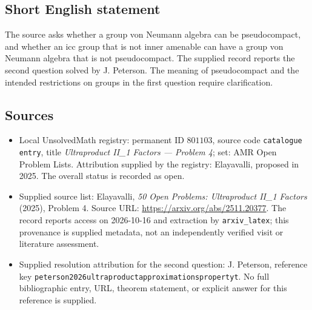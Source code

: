 \documentclass[11pt]{article}
\begin{document}
\subsection{Short English statement}
The source asks whether a group von Neumann algebra can be pseudocompact, and whether an icc group that is not inner amenable can have a group von Neumann algebra that is not pseudocompact. The supplied record reports the second question solved by J. Peterson. The meaning of pseudocompact and the intended restrictions on groups in the first question require clarification.
\subsection{Sources}
\begin{itemize}
\item Local UnsolvedMath registry: permanent ID \(801103\), source code \texttt{catalogue entry}, title \emph{Ultraproduct II\_1 Factors --- Problem 4}; set: AMR Open Problem Lists. Attribution supplied by the registry: Elayavalli, proposed in 2025. The overall status is recorded as open.
\item Supplied source list: Elayavalli, \emph{50 Open Problems: Ultraproduct II\_1 Factors} (2025), Problem 4. Source URL: \url{https://arxiv.org/abs/2511.20377}. The record reports access on 2026-10-16 and extraction by \texttt{arxiv\_latex}; this provenance is supplied metadata, not an independently verified visit or literature assessment.
\item Supplied resolution attribution for the second question: J. Peterson, reference key \texttt{peterson2026ultraproductapproximationspropertyt}. No full bibliographic entry, URL, theorem statement, or explicit answer for this reference is supplied.
\end{itemize}
\end{document}
